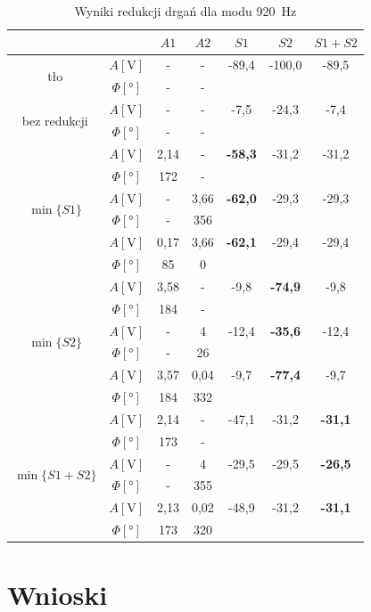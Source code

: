 \documentclass[polish,a4paper,11pt]{mwart}
\let\Oldsection\section
\renewcommand{\section}{\FloatBarrier\Oldsection}
\begin{document}
\begin{table}[!tbh]
  \centering
  \caption{Wyniki redukcji drgań dla modu \SI{920}{\hertz}}
  \label{tab:red5}
  \begin{tabular}{|c|c|c|c|c|c|c|}
    \cline{3-7}
    \multicolumn{2}{c|}{}&$A1$&$A2$&$S1$&$S2$&$S1+S2$\\\hline
    \multirow{2}{*}{tło}               &   $A [\si{\V}]$ & - & - & -89,4 & -100,0 & -89,5 \\\cline{2-7}
				       &$\Phi [\si{\degree}]$ & - & - & \multicolumn{3}{c}{}\\\hline
    \multirow{2}{*}{bez redukcji} &   $A [\si{\V}]$ & - & - & -7,5 & -24,3 & -7,4 \\\cline{2-7}
				       &$\Phi [\si{\degree}]$ & - & - & \multicolumn{3}{c}{}\\\hline
    \multirow{6}{*}{$\min\{S1\}$}      &   $A [\si{\V}]$ & 2,14 & - & \textbf{-58,3} & -31,2 & -31,2 \\\cline{2-7}
				       &$\Phi [\si{\degree}]$ & 172 & - & \multicolumn{3}{c}{}\\\cline{2-7}
				       &   $A [\si{\V}]$ & - & 3,66 & \textbf{-62,0} & -29,3 & -29,3 \\\cline{2-7}
				       &$\Phi [\si{\degree}]$ & - & 356 & \multicolumn{3}{c}{}\\\cline{2-7}
				       &   $A [\si{\V}]$ & 0,17 & 3,66 & \textbf{-62,1} & -29,4 & -29,4 \\\cline{2-7}
				       &$\Phi [\si{\degree}]$ & 85 & 0 & \multicolumn{3}{c}{}\\\hline
    \multirow{6}{*}{$\min\{S2\}$}      &   $A [\si{\V}]$ & 3,58 & - & -9,8 & \textbf{-74,9} & -9,8\\\cline{2-7}
				       &$\Phi [\si{\degree}]$ & 184 & - & \multicolumn{3}{c}{}\\\cline{2-7}
				       &   $A [\si{\V}]$ & - & 4 & -12,4 & \textbf{-35,6} & -12,4 \\\cline{2-7}
				       &$\Phi [\si{\degree}]$ & - & 26 & \multicolumn{3}{c}{}\\\cline{2-7}
				       &   $A [\si{\V}]$ & 3,57 & 0,04 & -9,7 & \textbf{-77,4} & -9,7\\\cline{2-7}
				       &$\Phi [\si{\degree}]$ & 184 & 332 & \multicolumn{3}{c}{}\\\hline
    \multirow{6}{*}{$\min\{S1+S2\}$}   &   $A [\si{\V}]$ & 2,14 & - & -47,1 & -31,2 & \textbf{-31,1}\\\cline{2-7}
				       &$\Phi [\si{\degree}]$ & 173 & - & \multicolumn{3}{c}{}\\\cline{2-7}
				       &   $A [\si{\V}]$ & - & 4 & -29,5 & -29,5 & \textbf{-26,5} \\\cline{2-7}
				       &$\Phi [\si{\degree}]$ & - & 355 & \multicolumn{3}{c}{}\\\cline{2-7}
				       &   $A [\si{\V}]$ & 2,13 & 0,02 & -48,9 & -31,2 & \textbf{-31,1} \\\cline{2-7}
				       &$\Phi [\si{\degree}]$ & 173 & 320 & \multicolumn{3}{c}{}\\\cline{1-4}
  \end{tabular}
\end{table}

\section{Wnioski}
\end{document}
